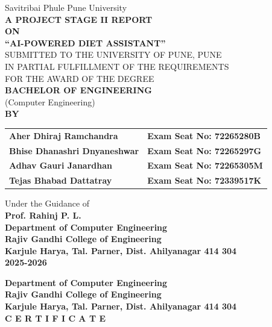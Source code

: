 \documentclass[12pt,a4paper]{report}
\newcommand{\UniversityName}{Savitribai Phule Pune University}
\newcommand{\CollegeName}{Rajiv Gandhi College of Engineering}
\newcommand{\DepartmentName}{Department of Computer Engineering}
\newcommand{\LocationLine}{Karjule Harya, Tal. Parner, Dist. Ahilyanagar 414 304}
\newcommand{\AcademicYear}{2025-2026}
\newcommand{\ProjectTitle}{AI-POWERED DIET ASSISTANT}
\newcommand{\GuideName}{Prof. Rahinj P. L.}
\newcommand{\StudentOne}{Aher Dhiraj Ramchandra}
\newcommand{\StudentTwo}{Bhise Dhanashri Dnyaneshwar}
\newcommand{\StudentThree}{Adhav Gauri Janardhan}
\newcommand{\StudentFour}{Tejas Bhabad Dattatray}
\newcommand{\SeatOne}{72265280B}
\newcommand{\SeatTwo}{72265297G}
\newcommand{\SeatThree}{72265305M}
\newcommand{\SeatFour}{72339517K}
\begin{document}

\begin{titlepage}
  \centering
  \vspace*{-4mm}
  {\normalsize \UniversityName\\[12pt]}
  {\normalsize\bfseries A PROJECT STAGE II REPORT\\[12pt] ON\\[24pt]
  \Large\textbf{“\ProjectTitle”}\\[24pt]}
  {\small SUBMITTED TO THE UNIVERSITY OF PUNE, PUNE\\
  IN PARTIAL FULFILLMENT OF THE REQUIREMENTS\\
  FOR THE AWARD OF THE DEGREE\\[6pt]
  \vspace{8mm}
  \textbf{BACHELOR OF ENGINEERING}\\(Computer Engineering)\\[14pt]}
  {\normalsize\bfseries BY\\[8pt]}
  \begin{center}
\begin{tabular}{l l}
\textbf{\StudentOne} & \textbf{Exam Seat No: \SeatOne} \\
\textbf{\StudentTwo} & \textbf{Exam Seat No: \SeatTwo} \\
\textbf{\StudentThree} & \textbf{Exam Seat No: \SeatThree} \\
\textbf{\StudentFour} & \textbf{Exam Seat No: \SeatFour} \\
\end{tabular}
\end{center}

  {\normalsize Under the Guidance of\\ \textbf{\GuideName}\\[18pt]}
  {\small\bfseries \DepartmentName\\ \CollegeName\\ \LocationLine\\[6pt]}
  {\small\bfseries \AcademicYear}
\end{titlepage}

\newpage
\thispagestyle{plain}
\begin{center}
  {\large\bfseries \DepartmentName\\[1pt] \CollegeName\\[1pt] \LocationLine\\[12pt]}
  \vspace{6pt}
  {\Large \bfseries C E R T I F I C A T E}\\[8pt]
\end{center}
\end{document}
